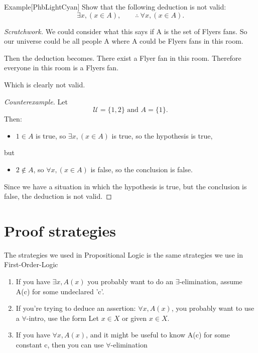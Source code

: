\documentclass[../MATH-2000-Notes.tex]{subfiles}
\begin{document}
\begin{commentbox}{Example}[{PhbLightCyan}]
    Show that the following deduction is not valid:
    $$ \exists x, (x \in A), \qquad \therefore \ \forall x, (x \in A) .$$
\end{commentbox}
\textit{Scratchwork.} We could consider what this says if A is the set of Flyers fans. So our universe could be all people A where A could be Flyers fans in this room.

Then the deduction becomes. There exist a Flyer fan in this room. Therefore everyone in this room is a Flyers fan.

Which is clearly not valid.

\begin{proof}[Counterexample]
    Let
	$$ \text{$\mathcal{U} = \{1,2\}$ and $A = \{1\}$.} $$
    Then:
    \begin{itemize}
    \item[] $1 \in A$ is true, so $\exists x, (x \in A)$ is true,
    so the hypothesis is true, 
    \end{itemize}
    but
    \begin{itemize}
    \item[] $2 \notin A$, so $\forall x, (x \in A)$ is false, so the conclusion is false.
    \end{itemize}
    Since we have a situation in which the hypothesis is true, but the conclusion is false, the deduction is not valid.
\end{proof}

\newpage

\section{Proof strategies}
The strategies  we used in Propositional Logic is the same strategies we use in First-Order-Logic
\begin{enumerate}
    \item If you have \(\exists x,A(x)\) you probably want to do an \(\exists\)-elimination, assume A(c) for some undeclared 'c'.
    \item If you're trying to deduce an assertion: \(\forall x, A(x)\), you probably want to use a \(\forall\)-intro, use the form Let \(x\in X\) or given \(x\in X\).
    \item If you have \(\forall x , A(x)\), and it might be useful to know A(c) for some constant c, then you can use \(\forall\)-elimination
\end{enumerate}
\end{document}
